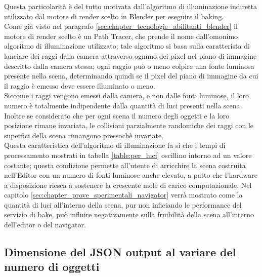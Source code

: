 Questa particolarità è del tutto motivata dall’algoritmo di illuminazione indiretta utilizzato dal motore di render scelto in Blender per eseguire il baking. 
\\
Come già visto nel paragrafo \ref{sec:chapter_tecnologie_abilitanti_blender} il motore di render scelto è un Path Tracer, che prende il nome dall’omonimo algoritmo di illuminazione utilizzato; tale algoritmo si basa sulla caratterista di lanciare dei raggi dalla camera attraverso ognuno dei pixel nel piano di immagine descritto dalla camera stessa; ogni raggio può o meno colpire una fonte luminosa presente nella scena, determinando quindi se il pixel del piano di immagine da cui il raggio è emesso deve essere illuminato o meno. 
\\
Siccome i raggi vengono emessi dalla camera, e non dalle fonti luminose, il loro numero è totalmente indipendente dalla quantità di luci presenti nella scena. 
\\
Inoltre se considerato che per ogni scena il numero degli oggetti e la loro posizione rimane invariata, le collisioni parzialmente randomiche dei raggi con le superfici della scena rimangono pressochè invariate.
\\ 
Questa caratteristica dell’algoritmo di illuminazione fa si che i tempi di processamento mostrati in tabella \ref{table:per_luci} oscillino intorno ad un valore costante; questa condizione permette all’utente di arricchire la scena costruita nell’Editor con un numero di fonti luminose anche elevato, a patto che l’hardware a disposizione riesca a sostenere la crescente mole di carico computazionale. Nel capitolo \ref{sec:chapter_prove_sperimentali_navigator} verrà mostrato come la quantità di luci all’interno della scena, pur non inficiando le performance del servizio di bake, può influire negativamente sulla fruibilità della scena all’interno dell’editor o del navigator.

\subsection{Dimensione del JSON output al variare del numero di oggetti}
\label{sec:chapter_prove_sperimentali_servizio_baking_dim_obj}

